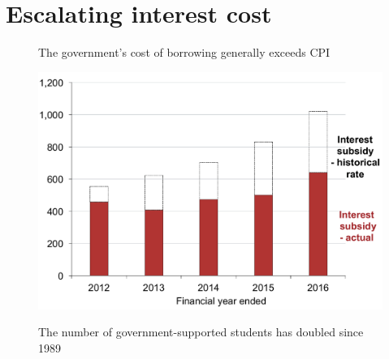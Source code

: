 \documentclass[embargoed]{grattan}
\begin{document}
\section{Escalating interest cost}\label{escalating-interest-cost}

\begin{figure}

\begin{minipage}[t][\textheight]{\columnwidth}
\vspace{\grattanfptop}
\caption[The government's cost of borrowing generally exceeds CPI]{The government's cost of borrowing generally exceeds \gls{CPI}}\label{fig:fig2-governments-cost-of-borrowing-exceeds-CPI}

\includegraphics[page=2]{atlas/Chartpack.pdf}
%
{\textcites{ABS2016ConsumerPriceIndex}{RBA-2015-f2Capitalmarketyields}{RBA2016F21Capitalmarket}}

\end{minipage} \hfill
\begin{minipage}[t][\textheight]{\columnwidth}
\vspace{\grattanfptop}
\caption{The number of government-supported students has doubled since 1989}\label{fig:fig3-number-govt-supported-students-doubled-since-1989}


\end{minipage}
\end{figure}
\end{document}

